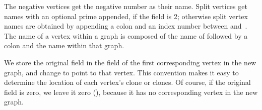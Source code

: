 The negative vertices get the negative number as their name. Split
vertices
get names with an optional prime appended, if the  field is 2;
otherwise split vertex names are obtained by appending a colon and an index
number between  and~. The name of a vertex within
a
graph  is composed of the name of  followed by a
colon and the name within that graph.

We store the original  field in the  field of the
first
corresponding vertex in the new graph, and change  to point to
that vertex. This convention makes it easy
to determine the location of each vertex's clone or clones.
Of course, if the original  field is zero, we leave it zero (\PB{$%
\NULL$}),
because it has no corresponding vertex in the new graph.


